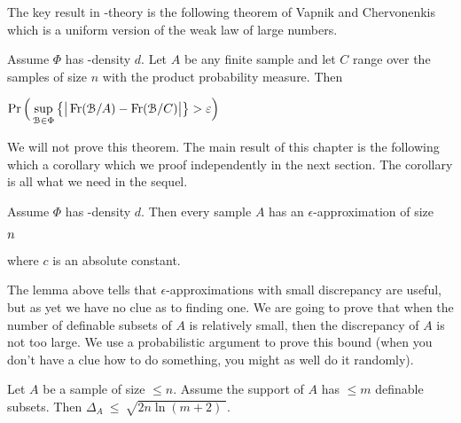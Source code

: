 \documentclass[sputnik.tex]{subfiles}
\begin{document}
The key result in \vc-theory is the following theorem of Vapnik and Chervonenkis which is a uniform version of the weak law of large numbers. 

\begin{theorem}\label{thm_vc}
\def\ceq#1#2#3{\parbox[t]{40ex}{$\displaystyle #1$}\medrel{#2}{$\displaystyle #3$}}
Assume $\Phi$ has \vc-density $d$. Let $A$ be any finite sample and let $C$ range over the samples of size $n$ with the product probability measure. Then 

\ceq{\hfill\Pr\Big(\sup_{\B\in\Phi}\big\{\big|\Fr(\B/A) - \Fr(\B/C)\big|\big\}>\epsilon\Big)}{\le}{8\,d\exp\Big(-\frac{n\epsilon^2}{32}\Big)}\QED
\end{theorem}

We will not prove this theorem. The main result of this chapter is the following which a corollary which we proof independently in the next section. The corollary is all what we need in the sequel.

\begin{corollary}\label{corol_epsilon_approx}
\def\ceq#1#2#3{\parbox[t]{20ex}{$\displaystyle #1$}\medrel{#2}{$\displaystyle #3$}}
Assume $\Phi$ has \vc-density $d$. Then every sample $A$ has an $\epsilon$-approximation of size 

\ceq{\hfill n}{\le}{c\,\frac{d}{\epsilon^{\scriptscriptstyle 2}}\ln\frac1\epsilon}

where $c$ is an absolute constant.
\end{corollary}

The lemma above tells that $\epsilon$-approximations with small discrepancy are useful, but as yet we have no clue as to finding one.
We are going to prove that when the number of definable subsets of $A$ is relatively small, then the discrepancy of $A$ is not too large.
We use a probabilistic argument to prove this bound (when you don't have a clue how to do something, you might as well do it randomly).


\begin{lemma}\label{lem_discrepanzarandom} 
Let $A$ be a sample of size $\le n$. Assume the support of $A$ has $\le m$  definable subsets. Then $\Delta_A\ \le\ \sqrt{2n\ln(m+2)\;}$.
\end{lemma}
\end{document}
